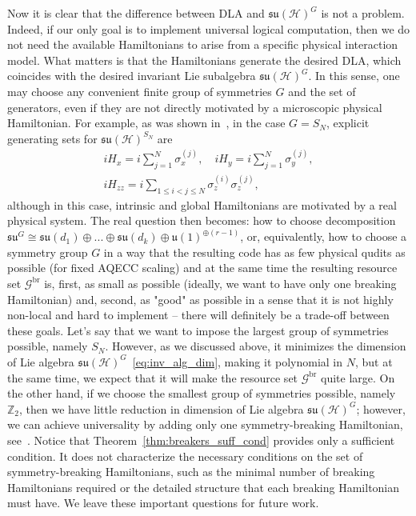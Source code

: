 \documentclass[10pt,twocolumn,superscriptaddress,aps,amsmath,amssymb,citeautoscript,floatfix,prx,longbibliography]{revtex4-2}
\newcounter{alg}
\theoremstyle{plain}
\theoremstyle{plain}
\theoremstyle{plain}
\theoremstyle{plain}
\theoremstyle{plain}
\theoremstyle{plain}
\begin{document}
Now it is clear that the difference between DLA and $\mathfrak{su}(\mathcal{H})^G$ is not a problem. Indeed, if our only goal is to implement universal logical computation, then we do not need the available Hamiltonians to arise from a specific physical interaction model. What matters is that the Hamiltonians generate the desired DLA, which coincides with the desired invariant Lie subalgebra \(\mathfrak{su}(\mathcal H)^G\). In this sense, one may choose any convenient finite group of symmetries $G$ and the set of generators, even if they are not directly motivated by a microscopic physical Hamiltonian. For example, as was shown in~\cite{Albertini2018}, in the case \(G=S_N\), explicit generating sets for \(\mathfrak{su}(\mathcal H)^{S_N}\) are 
\[
\begin{gathered}
    iH_x=i\sum_{j=1}^N \sigma_x^{(j)}, \quad iH_y=i\sum_{j=1}^N \sigma_y^{(j)}, \\
iH_{z z}=i\sum_{1\leq i<j\leq N} \sigma_z^{(i)} \sigma_z^{(j)},
\end{gathered}
\]
although in this case, intrinsic and global Hamiltonians are motivated by a real physical system.
The real question then becomes: how to choose decomposition $\mathfrak{su}^G\cong \mathfrak{su}(d_1)\oplus...\oplus\mathfrak{su}(d_k)\oplus \mathfrak{u}(1)^{\oplus(r-1)}$, or, equivalently, how to choose a symmetry group $G$ in a way that the resulting code has as few physical qudits as possible (for fixed AQECC scaling) and at the same time the resulting resource set $\mathcal{G}^{\text{br}}$ is, first, as small as possible (ideally, we want to have only one breaking Hamiltonian) and, second, as "good" as possible in a sense
that it is not highly non-local and hard to implement -- there will definitely be a trade-off between these goals.
Let's say that we want to impose the largest group of symmetries possible, namely $S_N$. However, as we discussed above, it minimizes the dimension of Lie algebra $\mathfrak{su}(\mathcal{H})^G$~\eqref{eq:inv_alg_dim},
making it polynomial in $N$, but at the same time, we expect that it will make the resource set $\mathcal{G}^{\text{br}}$ quite large.  
On the other hand, if we choose the smallest group of symmetries possible, namely $\mathbb{Z}_2$, then we have little reduction in dimension of Lie algebra $\mathfrak{su}(\mathcal{H})^G$; however, we can achieve universality by adding only one symmetry-breaking Hamiltonian, see~\cite{Hu2025}. Notice that Theorem~\ref{thm:breakers_suff_cond} provides only a sufficient condition. It does not characterize the necessary conditions on the set of symmetry-breaking Hamiltonians, such as the minimal number of breaking Hamiltonians required or the detailed structure that each breaking Hamiltonian must have. We leave these important questions for future work.
\end{document}
